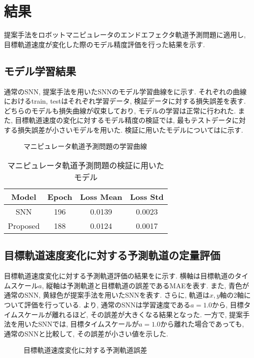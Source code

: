 \section{結果} \label{sec:result3}
提案手法をロボットマニピュレータのエンドエフェクタ軌道予測問題に適用し, 目標軌道速度が変化した際のモデル精度評価を行った結果を示す.

\subsection{モデル学習結果}
通常のSNN, 提案手法を用いたSNNのモデル学習曲線をに示す.
それぞれの曲線におけるtrain, testはそれぞれ学習データ, 検証データに対する損失誤差を表す.
どちらのモデルも損失曲線が収束しており, モデルの学習は正常に行われた.
また, 目標軌道速度の変化に対するモデル精度の検証では, 最もテストデータに対する損失誤差が小さいモデルを用いた.
検証に用いたモデルについてはに示す.
\begin{figure}[htb]
    \centering
    
    \caption{マニピュレータ軌道予測問題の学習曲線}
    \label{fig:result3:losscurve}
\end{figure}

\begin{table}[htb]
    \centering
    \caption{マニピュレータ軌道予測問題の検証に用いたモデル}
    \label{tab:result3:model:parameter}
    \begin{tabular}{cccc}
        \hline
        \textbf{Model}& \textbf{Epoch} & \textbf{Loss Mean} & \textbf{Loss Std}\\
        \hline
        SNN &  196 & 0.0139 & 0.0023\\ %
        Proposed & 188 & 0.0124 & 0.0017\\
        \hline
    \end{tabular}
\end{table}
\clearpage


\subsection{目標軌道速度変化に対する予測軌道の定量評価}
目標軌道速度変化に対する予測軌道評価の結果をに示す.
横軸は目標軌道のタイムスケール$a$, 縦軸は予測軌道と目標軌道の誤差であるMAEを表す.
また, 青色が通常のSNN, 黄緑色が提案手法を用いたSNNを表す.
さらに, 軌道は$x, y$軸の2軸について評価を行っている.
より, 通常のSNNは学習速度である$a=1.0$から, 目標タイムスケールが離れるほど, その誤差が大きくなる結果となった.
一方で, 提案手法を用いたSNNでは, 目標タイムスケールが$a=1.0$から離れた場合であっても, 通常のSNNと比較して, その誤差が小さい値を示した.
\begin{figure}[htb]
    \centering
    
    \caption{目標軌道速度変化に対する予測軌道誤差}
    \label{fig:result3:trjerror}
\end{figure}


